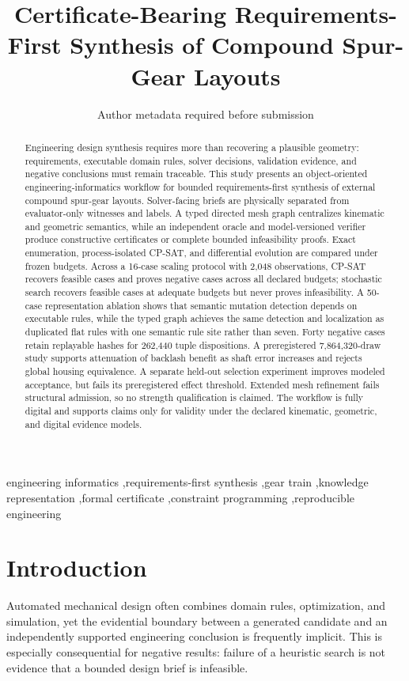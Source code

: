 \documentclass[preprint,12pt]{elsarticle}
\begin{document}
\begin{frontmatter}
\title{Certificate-Bearing Requirements-First Synthesis of Compound Spur-Gear Layouts}
\author{Author metadata required before submission}
\begin{abstract}
Engineering design synthesis requires more than recovering a plausible geometry: requirements, executable domain rules, solver decisions, validation evidence, and negative conclusions must remain traceable. This study presents an object-oriented engineering-informatics workflow for bounded requirements-first synthesis of external compound spur-gear layouts. Solver-facing briefs are physically separated from evaluator-only witnesses and labels. A typed directed mesh graph centralizes kinematic and geometric semantics, while an independent oracle and model-versioned verifier produce constructive certificates or complete bounded infeasibility proofs. Exact enumeration, process-isolated CP-SAT, and differential evolution are compared under frozen budgets. Across a 16-case scaling protocol with 2,048 observations, CP-SAT recovers feasible cases and proves negative cases across all declared budgets; stochastic search recovers feasible cases at adequate budgets but never proves infeasibility. A 50-case representation ablation shows that semantic mutation detection depends on executable rules, while the typed graph achieves the same detection and localization as duplicated flat rules with one semantic rule site rather than seven. Forty negative cases retain replayable hashes for 262,440 tuple dispositions. A preregistered 7,864,320-draw study supports attenuation of backlash benefit as shaft error increases and rejects global housing equivalence. A separate held-out selection experiment improves modeled acceptance, but fails its preregistered effect threshold. Extended mesh refinement fails structural admission, so no strength qualification is claimed. The workflow is fully digital and supports claims only for validity under the declared kinematic, geometric, and digital evidence models.
\end{abstract}
\begin{keyword}
engineering informatics \sep requirements-first synthesis \sep gear train \sep knowledge representation \sep formal certificate \sep constraint programming \sep reproducible engineering
\end{keyword}
\end{frontmatter}
\section{Introduction}
Automated mechanical design often combines domain rules, optimization, and simulation, yet the evidential boundary between a generated candidate and an independently supported engineering conclusion is frequently implicit. This is especially consequential for negative results: failure of a heuristic search is not evidence that a bounded design brief is infeasible.
\end{document}
